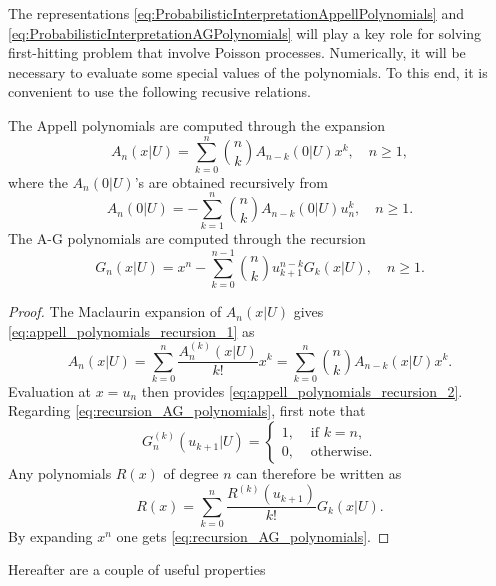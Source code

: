 The representations \eqref{eq:ProbabilisticInterpretationAppellPolynomials} and \eqref{eq:ProbabilisticInterpretationAGPolynomials} will play a key role for solving first-hitting problem that involve Poisson processes. Numerically, it will be necessary to evaluate some special values of the polynomials. To this end, it is convenient to use the following recusive relations. 
\begin{prop} 
The Appell polynomials are computed through the expansion
\begin{equation}\label{eq:appell_polynomials_recursion_1}
A_{n}(x|U)=\sum_{k=0}^{n}\binom{n}{k}A_{n-k}(0|U)x^{k}, \quad n\geq 1,
\end{equation}
where the $A_{n}(0|U)$'s are obtained recursively from 
\begin{equation}\label{eq:appell_polynomials_recursion_2}
A_{n}(0|U)=-\sum_{k=1}^{n} \binom{n}{k} A_{n-k}(0|U)u_{n}^{k}, \quad n\geq1.
\end{equation}
The A-G polynomials are computed through the recursion
\begin{equation}\label{eq:recursion_AG_polynomials}
G_{n}(x|U)=x^{n}-\sum_{k=0}^{n-1} \binom{n}{k} u_{k+1}^{n-k} G_{k}(x|U), \quad n\geq 1.
\end{equation}
\end{prop}
\begin{proof}
The Maclaurin expansion of $A_n(x|U)$ gives \eqref{eq:appell_polynomials_recursion_1} as
$$
A_n(x|U) = \sum_{k = 0}^n\frac{A_n^{(k)}(x|U)}{k!}x^k = \sum_{k = 0}^n\binom{n}{k}A_{n-k}(x|U)x^k.
$$
Evaluation at $x = u_n$ then provides \eqref{eq:appell_polynomials_recursion_2}. Regarding \eqref{eq:recursion_AG_polynomials}, first note that 
$$
G_n^{(k)}(u_{k+1}|U) = \begin{cases}
1,&\text{ if }k = n,\\
0,&\text{ otherwise.}
\end{cases}
$$
Any polynomials $R(x)$ of degree $n$ can therefore be written as 
$$
R(x)=\sum_{k = 0}^n\frac{R^{(k)}(u_{k+1})}{k!}G_k(x|U).
$$
By expanding $x^n$ one gets \eqref{eq:recursion_AG_polynomials}.
\end{proof}
Hereafter are a couple of useful properties
